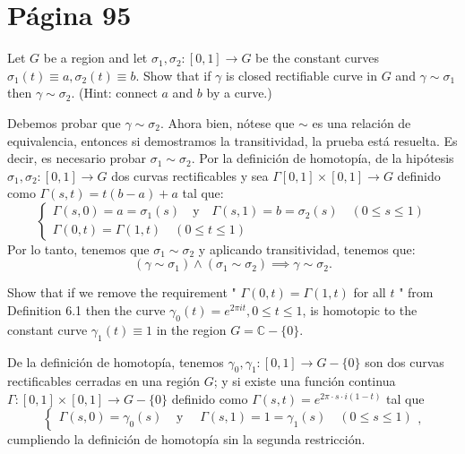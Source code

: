 \section{Página 95}

\begin{problema}
    Let $G$ be a region and let $\sigma_1, \sigma_2:[0,1] \rightarrow G$ be the constant curves $\sigma_1(t) \equiv a, \sigma_2(t) \equiv b$. Show that if $\gamma$ is closed rectifiable curve in $G$ and $\gamma \sim \sigma_1$ then $\gamma \sim \sigma_2$. (Hint: connect $a$ and $b$ by a curve.)
    \begin{dem}
        Debemos probar que $\gamma \sim \sigma_2$. Ahora bien, nótese que $\sim$ es una relación de equivalencia, entonces si demostramos la transitividad, la prueba está resuelta. Es decir, es necesario probar $\sigma_1\sim \sigma_2$. Por la definición de homotopía, de la hipótesis $\sigma_1,\sigma_2:[0,1]\to G$ dos curvas rectificables y sea $\Gamma[0,1]\times[0,1]\to G$ definido como $\Gamma(s,t)= t(b-a)+a$ tal que: 
        $$\begin{cases}
            \Gamma(s,0)=a =\sigma_1(s) \quad \text{y}\quad \Gamma(s,1)=b=\sigma_2(s) \quad (0\leq s\leq 1)\\
            \Gamma(0,t) =\Gamma(1,t)\quad (0\leq t\leq 1)
        \end{cases}$$
        Por lo tanto, tenemos que $\sigma_1\sim \sigma_2$ y aplicando transitividad, tenemos que:
        $$(\gamma\sim\sigma_1)\wedge(\sigma_1\sim\sigma_2)\implies \gamma\sim \sigma_2.$$
    \end{dem}
\end{problema}

\begin{problema}
    Show that if we remove the requirement " $\Gamma(0, t)=\Gamma(1, t)$ for all $t$ " from Definition 6.1 then the curve $\gamma_0(t)=e^{2 \pi i t}, 0 \leq t \leq 1$, is homotopic to the constant curve $\gamma_1(t) \equiv 1$ in the region $G=\mathbb{C}-\{0\}$.
    \begin{dem}
        De la definición de homotopía, tenemos $\gamma_0, \gamma_1:[0,1] \rightarrow G-\{0\}$ son dos curvas rectificables cerradas en una región  $G$; y si existe una función continua  $\Gamma:[0,1] \times[0,1] \rightarrow G-\{0\}$ definido como $\Gamma(s,t)=e^{2\pi\cdot s\cdot i(1-t) }$ tal que 
$$\begin{cases}\Gamma(s, 0)=\gamma_0(s) & \text { y } \quad \Gamma(s, 1)=1=\gamma_1(s) \quad(0 \leq s \leq 1) \end{cases},$$
cumpliendo la definición de homotopía sin la segunda restricción. 
    \end{dem}
\end{problema}






